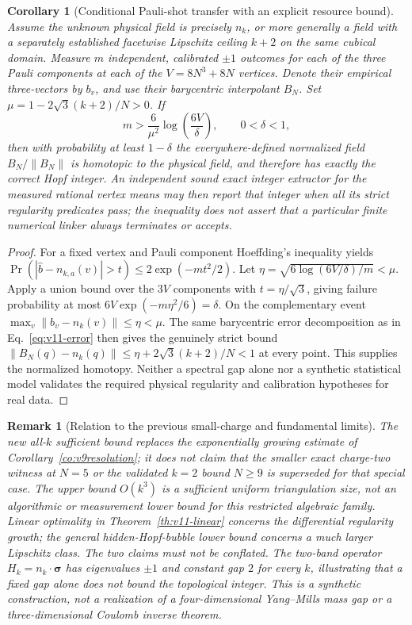 \documentclass[aps,prd,onecolumn,notitlepage,11pt,superscriptaddress,longbibliography]{revtex4-2}
\newtheorem{corollary}{Corollary}
\newtheorem{remark}{Remark}
\begin{document}
\begin{corollary}[Conditional Pauli-shot transfer with an explicit resource bound]\label{co:v11-shots}
Assume the unknown physical field is precisely $n_k$, or more generally a field with a separately established facetwise Lipschitz ceiling $k+2$ on the same cubical domain. Measure $m$ independent, calibrated $\pm1$ outcomes for \emph{each} of the three Pauli components at each of the $V=8N^3+8N$ vertices. Denote their empirical three-vectors by $b_v$, and use their barycentric interpolant $B_N$. Set $\mu=1-2\sqrt3(k+2)/N>0$. If
\begin{equation}\label{eq:v11-shots}
\boxed{\quad m>\frac{6}{\mu^2}\log\!\left(\frac{6V}{\delta}\right),\qquad 0<\delta<1,\quad}
\end{equation}
then with probability at least $1-\delta$ the everywhere-defined normalized field $B_N/\|B_N\|$ is homotopic to the physical field, and therefore has exactly the correct Hopf integer. An independent \emph{sound} exact integer extractor for the measured rational vertex means may then report that integer when all its strict regularity predicates pass; the inequality does not assert that a particular finite numerical linker always terminates or accepts.
\end{corollary}
\begin{proof}
For a fixed vertex and Pauli component Hoeffding's inequality yields $\Pr(|\widehat b-n_{k,a}(v)|>t)\le2\exp(-mt^2/2)$. Let $\eta=\sqrt{6\log(6V/\delta)/m}<\mu$. Apply a union bound over the $3V$ components with $t=\eta/\sqrt3$, giving failure probability at most $6V\exp(-m\eta^2/6)=\delta$. On the complementary event $\max_v\|b_v-n_k(v)\|\le\eta<\mu$. The same barycentric error decomposition as in Eq.~\eqref{eq:v11-error} then gives the genuinely strict bound $\|B_N(q)-n_k(q)\|\le\eta+2\sqrt3(k+2)/N<1$ at every point. This supplies the normalized homotopy. Neither a spectral gap alone nor a synthetic statistical model validates the required physical regularity and calibration hypotheses for real data.
\end{proof}

\begin{remark}[Relation to the previous small-charge and fundamental limits]
The new all-$k$ sufficient bound replaces the \emph{exponentially growing estimate} of Corollary~\ref{co:v9resolution}; it does not claim that the smaller exact charge-two witness at $N=5$ or the validated $k=2$ bound $N\ge9$ is superseded for that special case. The upper bound $O(k^3)$ is a sufficient uniform triangulation size, not an algorithmic or measurement lower bound for this restricted algebraic family. Linear optimality in Theorem~\ref{th:v11-linear} concerns the \emph{differential regularity growth}; the general hidden-Hopf-bubble lower bound concerns a much larger Lipschitz class. The two claims must not be conflated. The two-band operator $H_k=n_k\cdot\bm\sigma$ has eigenvalues $\pm1$ and constant gap $2$ for every $k$, illustrating that a fixed gap alone does not bound the topological integer. This is a synthetic construction, not a realization of a four-dimensional Yang--Mills mass gap or a three-dimensional Coulomb inverse theorem.
\end{remark}
\end{document}
